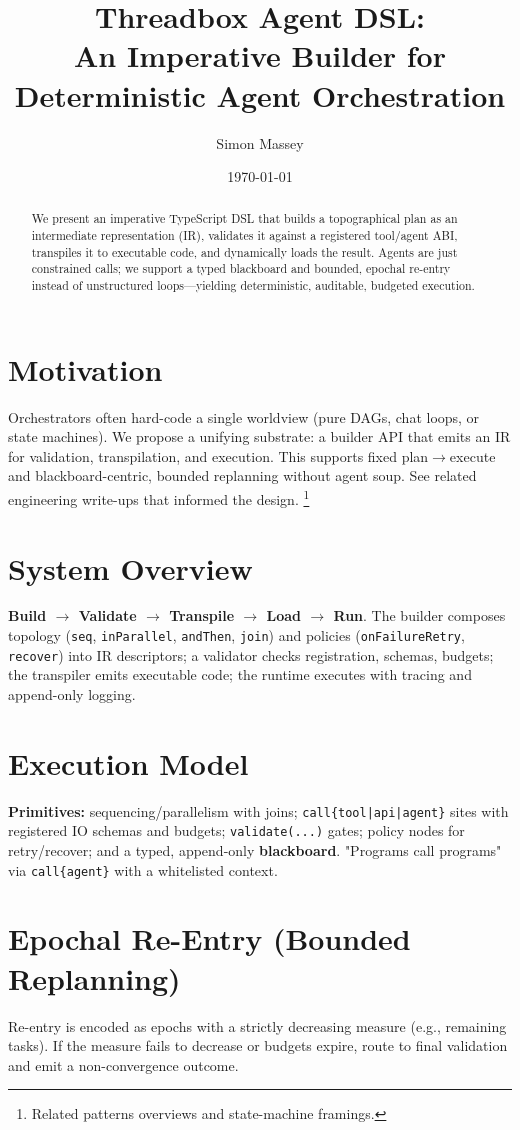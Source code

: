 \documentclass[11pt,a4paper]{article}
\title{Threadbox Agent DSL:\\ An Imperative Builder for Deterministic Agent Orchestration}
\author{Simon Massey}
\date{\today}
\begin{document}
\maketitle
\begin{abstract}
We present an imperative TypeScript DSL that builds a topographical plan as an intermediate representation (IR), validates it against a registered tool/agent ABI, transpiles it to executable code, and dynamically loads the result. Agents are just constrained calls; we support a typed blackboard and bounded, epochal re-entry instead of unstructured loops—yielding deterministic, auditable, budgeted execution.
\end{abstract}
\section{Motivation}
Orchestrators often hard-code a single worldview (pure DAGs, chat loops, or state machines). We propose a unifying substrate: a builder API that emits an IR for validation, transpilation, and execution. This supports fixed plan$\rightarrow$execute and blackboard-centric, bounded replanning without agent soup. See related engineering write-ups that informed the design.%
\footnote{Related patterns overviews and state-machine framings.}
\section{System Overview}
\textbf{Build $\rightarrow$ Validate $\rightarrow$ Transpile $\rightarrow$ Load $\rightarrow$ Run}. The builder composes topology (\texttt{seq}, \texttt{inParallel}, \texttt{andThen}, \texttt{join}) and policies (\texttt{onFailureRetry}, \texttt{recover}) into IR descriptors; a validator checks registration, schemas, budgets; the transpiler emits executable code; the runtime executes with tracing and append-only logging.
\section{Execution Model}
\textbf{Primitives:} sequencing/parallelism with joins; \texttt{call\{tool|api|agent\}} sites with registered IO schemas and budgets; \texttt{validate(...)} gates; policy nodes for retry/recover; and a typed, append-only \textbf{blackboard}. "Programs call programs" via \texttt{call\{agent\}} with a whitelisted context.
\section{Epochal Re-Entry (Bounded Replanning)}
Re-entry is encoded as epochs with a strictly decreasing measure (e.g., remaining tasks). If the measure fails to decrease or budgets expire, route to final validation and emit a non-convergence outcome.
\end{document}
